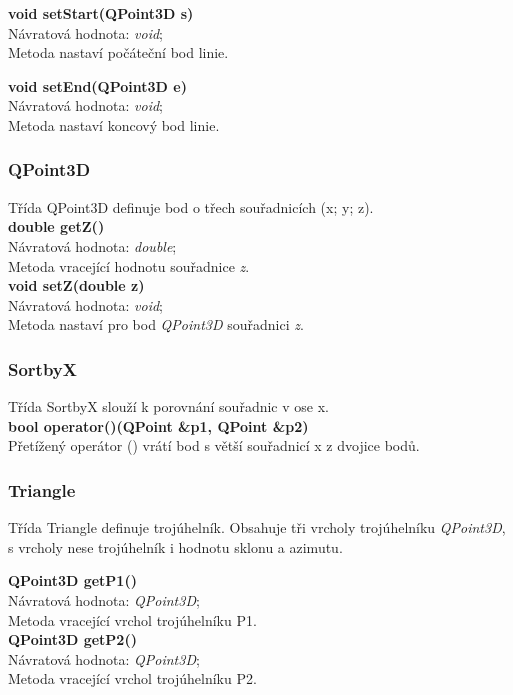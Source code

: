 \documentclass[a4paper, 12pt]{article}
\begin{document}
\textbf{void setStart(QPoint3D s)}\\
Návratová hodnota: \textit{void};\\
Metoda nastaví počáteční bod linie.

\textbf{void setEnd(QPoint3D e)}\\
Návratová hodnota: \textit{void};\\
Metoda nastaví koncový bod linie.

\subsubsection{QPoint3D}
Třída QPoint3D definuje bod o třech souřadnicích (x; y; z).
\\

\textbf{double getZ()}\\
Návratová hodnota: \textit{double};\\
Metoda vracející hodnotu souřadnice \textit{z}.
\\

\textbf{void setZ(double z)}\\
Návratová hodnota: \textit{void};\\
Metoda nastaví pro bod \textit{QPoint3D} souřadnici \textit{z}.

\subsubsection{SortbyX}
Třída SortbyX slouží k porovnání souřadnic v ose x.\\

\textbf{bool operator()(QPoint \&p1, QPoint \&p2)}\\
Přetížený operátor () vrátí bod s větší souřadnicí x z dvojice bodů.

\subsubsection{Triangle}
Třída Triangle definuje trojúhelník. Obsahuje tři vrcholy trojúhelníku \textit{QPoint3D}, s vrcholy nese trojúhelník i hodnotu sklonu a azimutu. 

\textbf{QPoint3D getP1()}\\
Návratová hodnota: \textit{QPoint3D};\\
Metoda vracející vrchol trojúhelníku P1. 
\\

\textbf{QPoint3D getP2()}\\
Návratová hodnota: \textit{QPoint3D};\\
Metoda vracející vrchol trojúhelníku P2. 
\\
\end{document}
